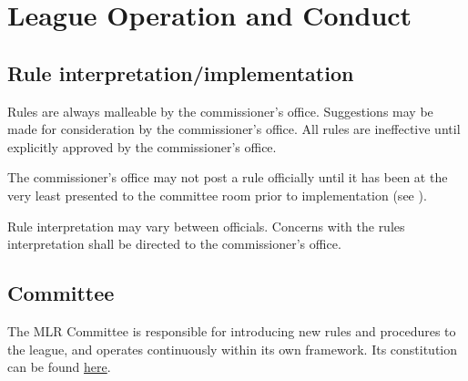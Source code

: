 
\section{League Operation and Conduct}

\subsection{Rule interpretation/implementation}
\begin{deepEnumerate}
	\item Rules are always malleable by the commissioner's office.
	Suggestions may be made for consideration by the commissioner's office.
	All rules are ineffective until explicitly approved by the commissioner's office.
	\item The commissioner’s office may not post a rule officially 
	until it has been at the very least presented to the committee room 
	prior to implementation (see ).
	\item Rule interpretation may vary between officials.
	Concerns with the rules interpretation shall be directed to the commissioner’s office.
\end{deepEnumerate}

\subsection{Committee}
\label{sec:Committee}
\begin{deepEnumerate}
	\item The MLR Committee is responsible for introducing new rules and procedures to the league,
	and operates continuously within its own framework.
	Its constitution can be found \href{https://docs.google.com/document/d/1_bd2r2KycOuCXXBswZ_7yTmSPYdP5W_ju41N0fB13nM/edit}{here}.
\end{deepEnumerate}

